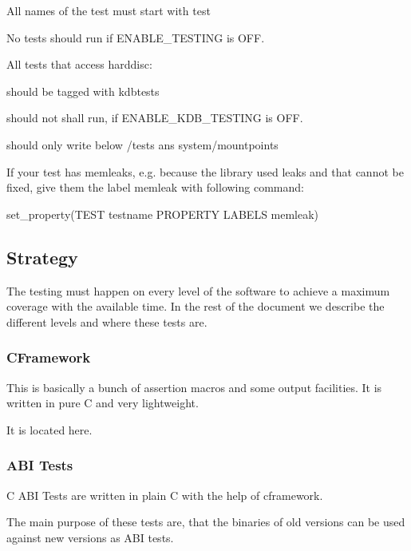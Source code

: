 \begin{DoxyItemize}
\item All names of the test must start with test
\item No tests should run if E\+N\+A\+B\+L\+E\+\_\+\+T\+E\+S\+T\+I\+N\+G is O\+F\+F.
\item All tests that access harddisc\+:
\begin{DoxyItemize}
\item should be tagged with kdbtests
\item should not shall run, if E\+N\+A\+B\+L\+E\+\_\+\+K\+D\+B\+\_\+\+T\+E\+S\+T\+I\+N\+G is O\+F\+F.
\item should only write below /tests ans system/mountpoints
\end{DoxyItemize}
\item If your test has memleaks, e.\+g. because the library used leaks and that cannot be fixed, give them the label memleak with following command\+:

set\+\_\+property(\+T\+E\+S\+T testname P\+R\+O\+P\+E\+R\+T\+Y L\+A\+B\+E\+L\+S memleak)
\end{DoxyItemize}

\subsection*{Strategy}

The testing must happen on every level of the software to achieve a maximum coverage with the available time. In the rest of the document we describe the different levels and where these tests are.

\subsubsection*{C\+Framework}

This is basically a bunch of assertion macros and some output facilities. It is written in pure C and very lightweight.

It is located here.

\subsubsection*{A\+B\+I Tests}

C A\+B\+I Tests are written in plain C with the help of cframework.

The main purpose of these tests are, that the binaries of old versions can be used against new versions as A\+B\+I tests.

